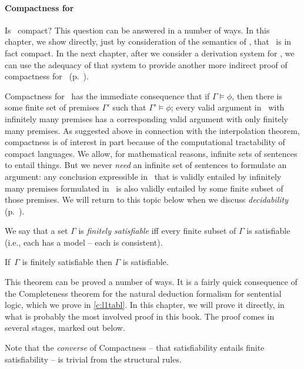 \paragraph{Compactness for \lone} Is \lone\ compact? This question can be answered in a number of ways. In this chapter, we show directly, just by consideration of the semantics of \lone, that \lone\ is in fact compact. In the next chapter, after we consider a derivation system for \lone, we can use the adequacy of that system to provide another more indirect proof of compactness for \lone\ (p.\ \pageref{compagain}).

Compactness for \lone\ has the immediate consequence that if $\Gamma\vDash\phi$, then there is some finite set of premises $\Gamma'$ such that $\Gamma'\vDash\phi$; every valid argument in \lone\ with infinitely many premises has a corresponding valid argument with only finitely many premises. As suggested above in connection with the interpolation theorem, compactness is of interest in part because of the computational tractability of compact languages. We allow, for mathematical reasons, infinite sets of sentences to entail things. But we never \emph{need} an infinite set of sentences to formulate an argument: any conclusion expressible in \lone\ that is validly entailed by infinitely many premises formulated in \lone\ is also validly entailed by some finite subset of those premises. We will return to this topic below when we discuss \emph{decidability} (p.\ \pageref{decide}).

\begin{definition}
	We say that a set $\Gamma$ is \emph{finitely satisfiable} iff every finite subset of $\Gamma$ is satisfiable (i.e., each has a model – each is consistent).
\end{definition}
\begin{theorem}[Compactness]\label{compact}
If\, $\Gamma$ is finitely satisfiable then $\Gamma$ is satisfiable. 
\end{theorem}

This theorem can be proved a number of ways. It is a fairly quick consequence of the Completeness theorem for the natural deduction formalism for sentential logic, which we prove in \autoref{c:l1tabl}. In this chapter, we will prove it directly, in what is probably the most involved proof in this book. The proof comes in several stages, marked out below.

Note that the \emph{converse} of Compactness – that satisfiability entails finite satisfiability – is trivial from the structural rules.

